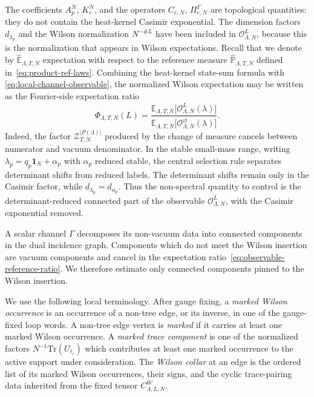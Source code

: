 \documentclass[11pt,a4paper,reqno]{amsart}
\theoremstyle{definition}
\theoremstyle{remark}
\newcommand\E{{\mathbb E}}
\newcommand\Tr{{\mathrm{Tr}}}
\newcommand\Pbb{{\mathbb{P}}}
\begin{document}
The coefficients $A_p^N$, $K_e^N$, and the operators $C_{e,N}$, $\Pi^\Gamma_{e,N}$ are topological quantities: they do not contain the heat-kernel Casimir exponential.  The dimension factors $d_{\lambda_p}$ and the Wilson normalization $N^{-\#L}$ have been included in $\mathcal O^L_{\Lambda,N}$, because this is the normalization that appears in Wilson expectations. Recall that we denote by $\widehat\E_{\Lambda,T,N}$ expectation with respect to the reference measure $\widehat\Pbb_{\Lambda,T,N}$ defined in~\eqref{eq:product-ref-laws}. Combining the heat-kernel state-sum formula with \eqref{eq:local-channel-observable}, the normalized Wilson expectation may be written as the Fourier-side expectation ratio
\begin{equation}\label{eq:observable-reference-ratio}
\Phi_{\Lambda,T,N}(L)
=
\frac{
\widehat\E_{\Lambda,T,N}\bigl[\mathcal O^L_{\Lambda,N}(\lambda)\bigr]
}{
\widehat\E_{\Lambda,T,N}\bigl[\mathcal O^\varnothing_{\Lambda,N}(\lambda)\bigr]
}.
\end{equation}
Indeed, the factor $\mathcal Z_{T,N}^{|P(\Lambda)|}$ produced by the change of measure cancels between numerator and vacuum denominator. In the stable small-mass range, writing $\lambda_p=q_p\mathbf 1_N+\alpha_p$ with $\alpha_p$ reduced stable, the central selection rule separates determinant shifts from reduced labels.  The determinant shifts remain only in the Casimir factor, while $d_{\lambda_p}=d_{\alpha_p}$.  Thus the non-spectral quantity to control is the determinant-reduced connected part of the observable $\mathcal O^L_{\Lambda,N}$, with the Casimir exponential removed.

A scalar channel $\Gamma$ decomposes its non-vacuum data into connected components in the dual incidence graph.  Components which do not meet the Wilson insertion are vacuum components and cancel in the expectation ratio~\eqref{eq:observable-reference-ratio}. We therefore estimate only connected components pinned to the Wilson insertion.

We use the following local terminology.  After gauge fixing, a \emph{marked Wilson occurrence} is an occurrence of a non-tree edge, or its inverse, in one of the gauge-fixed loop words.  A non-tree edge vertex is \emph{marked} if it carries at least one marked Wilson occurrence.  A \emph{marked trace component} is one of the normalized factors $N^{-1}\Tr(U_{\ell_i})$ which contributes at least one marked occurrence to the active support under consideration.  The \emph{Wilson collar} at an edge is the ordered list of its marked Wilson occurrences, their signs, and the cyclic trace-pairing data inherited from the fixed tensor $C^W_{\Lambda,L,N}$.
\end{document}
